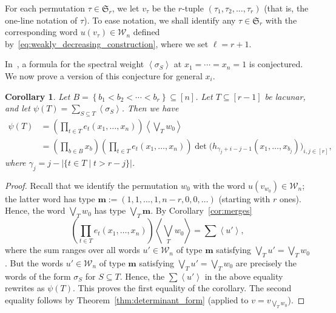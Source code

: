 \documentclass[reqno]{amsart}
\newcommand{\0}{\phantom{c}}
\newcommand{\swt}[1]{\left\langle #1 \right\rangle} %
\newcommand{\SymGp}[1]{\mathfrak{S}_{#1}} %
\newcommand{\mm}{\mathbf{m}}
\newcommand{\mcW}{\mathcal{W}}
\let\sumnonlimits\sum
\let\prodnonlimits\prod
\renewcommand{\sum}{\sumnonlimits\limits}
\renewcommand{\prod}{\prodnonlimits\limits}
\newcommand{\set}[1]{\left\{ #1 \right\}}
\newcommand{\abs}[1]{\left| #1 \right|}
\newcommand{\tup}[1]{\left( #1 \right)}
\newcommand{\ive}[1]{\left[ #1 \right]}
\theoremstyle{plain}
\newtheorem{cor}[thm]{Corollary}
\theoremstyle{definition}
\numberwithin{equation}{section}
\begin{document}
For each permutation $\tau \in \SymGp{r}$, we let $v_\tau$ be the $r$-tuple $\tup{\tau_1, \tau_2, \ldots, \tau_r}$ (that is, the one-line notation of $\tau$).
To ease notation, we shall identify any $\tau \in \SymGp{r}$ with the corresponding word $u(v_{\tau}) \in \mcW_n$ defined by~\eqref{eq:weakly_decreasing_construction}, where we set $\ell=r+1$.

In~\cite[Conj.~3.10]{AasLin17}, a formula for the spectral weight $\swt{\sigma_S}$ at $x_1 = \cdots = x_n = 1$ is conjectured.
We now prove a version of this conjecture for general $x_i$.

\begin{cor}
\label{cor:special_weight_lacunar}
Let $B = \set{b_1 < b_2 < \cdots < b_r} \subseteq \ive{n}$.
Let $T \subseteq \ive{r-1}$ be lacunar, and let $\psi(T) = \sum_{S \subseteq T} \swt{\sigma_S}$.
Then we have
\begin{align*}
  \psi(T) & = \left(\prod_{t \in T} e_t(x_1, \dotsc, x_n) \right) \swt{ \bigvee_T w_0}
  \\ & = \left( \prod_{b \in B} x_b \right) \left(\prod_{t \in T} e_t(x_1, \dotsc, x_n) \right) \det\bigl(h_{\gamma_j+i-j-1}(x_1, \dotsc, x_{b_j})\bigr)_{i, j \in \ive{r}},
\end{align*}
where $\gamma_j = j - \abs{ \{t \in T \mid t > r - j \} }$.
\end{cor}

\begin{proof}
Recall that we identify the permutation $w_0$ with the word $u(v_{w_0}) \in \mcW_n$;
the latter word has type
$\mm := \tup{1,1,\ldots,1,n-r,0,0,\ldots}$ (starting with $r$
ones).
Hence, the word $\bigvee_T w_0$ has type $\bigvee_T \mm$.
By Corollary~\ref{cor:merges}
\[
\left(\prod_{t \in T} e_t(x_1, \dotsc, x_n) \right) \swt{ \bigvee_T w_0} = \sum \swt{u'} ,
\]
where the sum ranges over all words $u' \in \mcW_n$
of type $\mm$ satisfying
$\bigvee_T u' = \bigvee_T w_0$.
But the words $u' \in \mcW_n$ of type $\mm$ satisfying
$\bigvee_T u' = \bigvee_T w_0$ are precisely the words of the form
$\sigma_S$ for $S \subseteq T$.
Hence, the $\sum \swt{u'}$ in the above equality rewrites as $\psi(T)$.
This proves the first equality of the corollary.
The second equality follows by Theorem~\ref{thm:determinant_form}
(applied to $v = v_{\bigvee_T w_0}$).
\end{proof}
\end{document}
